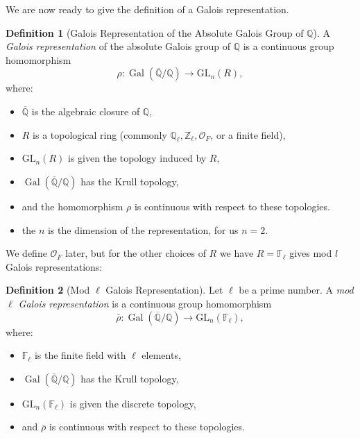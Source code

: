 \documentclass{article}
\theoremstyle{definition}
\newtheorem{definition}{Definition}[section]
\theoremstyle{definition}
\theoremstyle{definition}
\newcommand{\F}{\mathbb{F}}
\begin{document}
We are now ready to give the definition of a Galois representation.

\begin{definition}[Galois Representation of the Absolute Galois Group of \(\mathbb{Q}\)]
A \emph{Galois representation} of the absolute Galois group of \( \mathbb{Q} \) is a continuous group homomorphism
\[
\rho : \operatorname{Gal}(\overline{\mathbb{Q}}/\mathbb{Q}) \longrightarrow \mathrm{GL}_n(R),
\]
where:
\begin{itemize}
    \item \( \overline{\mathbb{Q}} \) is the algebraic closure of \( \mathbb{Q} \),
    \item \( R \) is a topological ring (commonly \( \mathbb{Q}_\ell, \mathbb{Z}_\ell, \mathcal{O}_F \), or a finite field),
    \item \( \mathrm{GL}_n(R) \) is given the topology induced by \( R \),
    \item \( \operatorname{Gal}(\overline{\mathbb{Q}}/\mathbb{Q}) \) has the Krull topology,
    \item and the homomorphism \( \rho \) is continuous with respect to these topologies.
    \item the $n$ is the dimension of the representation, for us $n=2$.
\end{itemize}
\end{definition}

We define $\mathcal{O}_F$ later, but for the other choices of $R$ we have $R=\F_\ell$ gives mod $l$ Galois representations:

\begin{definition}[Mod \(\ell\) Galois Representation]
Let \(\ell\) be a prime number. A \emph{mod \(\ell\) Galois representation} is a continuous group homomorphism
\[
\bar{\rho} : \operatorname{Gal}(\overline{\mathbb{Q}}/\mathbb{Q}) \longrightarrow \mathrm{GL}_n(\mathbb{F}_\ell),
\]
where:
\begin{itemize}
    \item \( \mathbb{F}_\ell \) is the finite field with \( \ell \) elements,
    \item \( \operatorname{Gal}(\overline{\mathbb{Q}}/\mathbb{Q}) \) has the Krull topology,
    \item \( \mathrm{GL}_n(\mathbb{F}_\ell) \) is given the discrete topology,
    \item and \( \bar{\rho} \) is continuous with respect to these topologies.
\end{itemize}
\end{definition}
\end{document}
